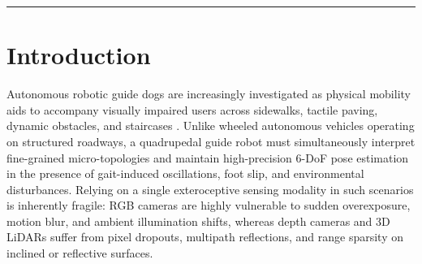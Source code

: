 \documentclass[11pt, a4paper]{article}
\begin{document}
\begin{abstract}
\vspace{6pt}
\noindent
\textbf{Keywords:} Reliability-aware multi-view clustering; RGB-D terrain perception; Asymmetric sensor degradation; Cluster-to-terrain calibration; Semantic-adaptive particle filter; Robotic guide dog
\end{abstract}

\hrule
\vspace{12pt}

\section{Introduction}
\label{sec:intro}
Autonomous robotic guide dogs are increasingly investigated as physical mobility aids to accompany visually impaired users across sidewalks, tactile paving, dynamic obstacles, and staircases \cite{patel2024review, wang2026design, hwang2022system}. Unlike wheeled autonomous vehicles operating on structured roadways, a quadrupedal guide robot must simultaneously interpret fine-grained micro-topologies and maintain high-precision 6-DoF pose estimation in the presence of gait-induced oscillations, foot slip, and environmental disturbances. Relying on a single exteroceptive sensing modality in such scenarios is inherently fragile: RGB cameras are highly vulnerable to sudden overexposure, motion blur, and ambient illumination shifts, whereas depth cameras and 3D LiDARs suffer from pixel dropouts, multipath reflections, and range sparsity on inclined or reflective surfaces.
\end{document}
